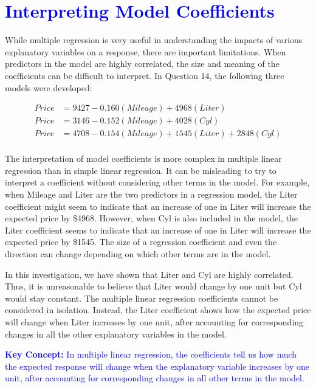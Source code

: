 \documentclass[
]{report}
\begin{document}
\hypertarget{section-30}{%
\section{\texorpdfstring{\textcolor{blue}{Interpreting Model Coefficients}}{}}\label{section-30}}

While multiple regression is very useful in understanding the impacts of various explanatory variables on a response, there are important limitations. When predictors in the model are highly correlated, the size and meaning of the coefficients can be difficult to interpret. In Question 14, the following three models were developed:

\begin{align*}
 Price &= 9427 - 0.160(Mileage) + 4968(Liter)\\
 Price &= 3146 - 0.152(Mileage) + 4028(Cyl)\\
 Price &= 4708 - 0.154(Mileage) + 1545(Liter) + 2848(Cyl)\\
 \end{align*}

The interpretation of model coefficients is more complex in multiple linear regression than in simple linear regression. It can be misleading to try to interpret a coefficient without considering other terms in the model. For example, when Mileage and Liter are the two predictors in a regression model, the Liter coefficient might seem to indicate that an increase of one in Liter will increase the expected price by \$4968. However, when Cyl is also included in the model, the Liter coefficient seems to indicate that an increase of one in Liter will increase the expected price by \$1545. The size of a regression coefficient and even the direction can change depending on which other terms are in the model.

In this investigation, we have shown that Liter and Cyl are highly correlated. Thus, it is unreasonable to believe that Liter would change by one unit but Cyl would stay constant. The multiple linear regression coefficients cannot be considered in isolation. Instead, the Liter coefficient shows how the expected price will change when Liter increases by one unit, after accounting for corresponding changes in all the other
explanatory variables in the model.

\textbf{\textcolor{blue}{Key Concept:}}
\textcolor{blue}{In multiple linear regression, the coefficients tell us how much the expected response will change when the explanatory variable increases by one unit, after accounting for corresponding changes in all other terms in the model.}
\end{document}
